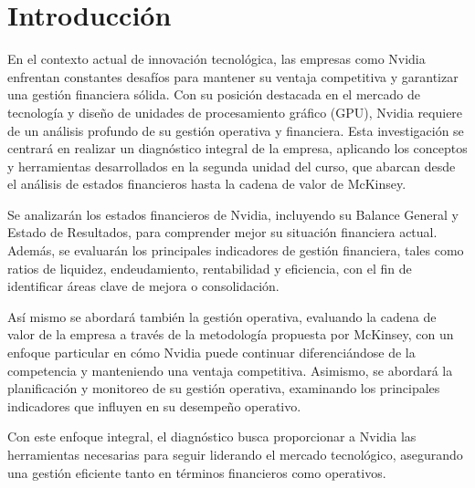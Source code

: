 \documentclass{article}
\newenvironment{introduccion}{}{}
\begin{document}
\begin{introduccion}
  \section{Introducción}

    En el contexto actual de innovación tecnológica, las empresas como Nvidia enfrentan constantes desafíos para mantener su ventaja competitiva y garantizar una gestión financiera sólida. Con su posición destacada en el mercado de tecnología y diseño de unidades de procesamiento gráfico (GPU), Nvidia requiere de un análisis profundo de su gestión operativa y financiera. Esta investigación se centrará en realizar un diagnóstico integral de la empresa, aplicando los conceptos y herramientas desarrollados en la segunda unidad del curso, que abarcan desde el análisis de estados financieros hasta la cadena de valor de McKinsey.

    Se analizarán los estados financieros de Nvidia, incluyendo su Balance General y Estado de Resultados, para comprender mejor su situación financiera actual. Además, se evaluarán los principales indicadores de gestión financiera, tales como ratios de liquidez, endeudamiento, rentabilidad y eficiencia, con el fin de identificar áreas clave de mejora o consolidación.

    Así mismo se abordará también la gestión operativa, evaluando la cadena de valor de la empresa a través de la metodología propuesta por McKinsey, con un enfoque particular en cómo Nvidia puede continuar diferenciándose de la competencia y manteniendo una ventaja competitiva. Asimismo, se abordará la planificación y monitoreo de su gestión operativa, examinando los principales indicadores que influyen en su desempeño operativo.

    Con este enfoque integral, el diagnóstico busca proporcionar a Nvidia las herramientas necesarias para seguir liderando el mercado tecnológico, asegurando una gestión eficiente tanto en términos financieros como operativos.
    
\end{introduccion}

\vspace*{\fill}

\newpage
\end{document}
